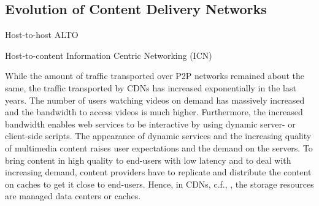 \subsection{Evolution of Content Delivery Networks}


Host-to-host
ALTO

Host-to-content Information Centric Networking (ICN)

While the amount of traffic transported over P2P networks remained about the same, the traffic transported by CDNs has increased exponentially \cite{cisco2016} in the last years.
The number of users watching videos on demand has massively increased and the bandwidth to access videos is much higher.
Furthermore, the increased bandwidth enables web services to be interactive by using dynamic server- or client-side scripts.
The appearance of dynamic services and the increasing quality of multimedia content raises user expectations and the demand on the servers.
To bring content in high quality to end-users with low latency and to deal with increasing demand, content providers have to replicate and distribute the content on caches to get it close to end-users.
Hence, in CDNs, c.f., , the storage resources are managed data centers or caches.




